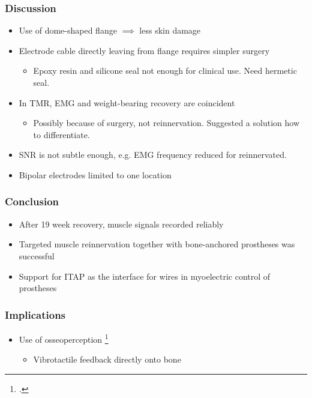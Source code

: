 \begin{frame}
    \frametitle{Discussion}

    \begin{itemize}
        \item Use of dome-shaped flange $\implies$ less skin damage
        \item Electrode cable directly leaving from flange requires simpler surgery \begin{itemize}
            \item Epoxy resin and silicone seal not enough for clinical use. Need hermetic seal.
        \end{itemize}
        \item In TMR, EMG and weight-bearing recovery are coincident \begin{itemize}
            \item Possibly because of surgery, not reinnervation. Suggested a solution how to differentiate.
        \end{itemize}
        \item SNR is not subtle enough, e.g. EMG frequency reduced for reinnervated.
        \item Bipolar electrodes limited to one location
    \end{itemize}

\end{frame}

\begin{frame}
    \frametitle{Conclusion}

    \begin{itemize}
        \item After 19 week recovery, muscle signals recorded reliably
        \item Targeted muscle reinnervation together with bone-anchored prostheses was successful
        \item Support for ITAP as the interface for wires in myoelectric control of prostheses
    \end{itemize}

\end{frame}

\begin{frame}
    \frametitle{Implications}

    \begin{figure}[h]\centering
    \end{figure}
    \begin{itemize}
        \item Use of osseoperception \footcite{ClementeFrancesco2017TaHM, ÖrgelMarcus2021Oito} \begin{itemize}
            \item Vibrotactile feedback directly onto bone
        \end{itemize}
    \end{itemize}
\end{frame}